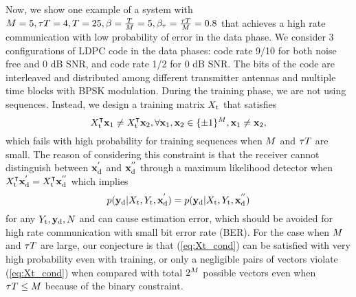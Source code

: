 \documentclass[conference]{IEEEtran}
\begin{document}
Now, we show one example of a system with $M=5,{\tau T}=4,T=25,\beta=\frac{T}{M}=5,\beta_{\rm{\tau}}=\frac{{\tau T}}{M}=0.8$ that achieves a high rate communication with low probability of error in the data phase. We consider 3 configurations of LDPC code in the data phases: code rate 9/10 for both noise free and 0 dB SNR, and code rate 1/2 for 0 dB SNR. The bits of the code are interleaved and distributed among different transmitter antennas and multiple time blocks with BPSK modulation. During the training phase, we are not using \iid sequences. Instead, we design a training matrix $X_{\rm t}$ that satisfies
\begin{equation}
    X_{\rm t}^{\intercal}{\mathbf{x}}_1\neq X_{\rm t}^{\intercal}{\mathbf{x}}_2,\forall {\mathbf{x}}_1,{\mathbf{x}}_2\in\{\pm1\}^M,{\mathbf{x}}_1\neq{\mathbf{x}}_2,
    \label{eq:Xt_cond}
\end{equation}
which fails with high probability for \iid training sequences when $M$ and ${\tau T}$ are small. The reason of considering this constraint is that the receiver cannot distinguish between ${\mathbf{x}}_{\rm d}^{'}$ and ${\mathbf{x}}_{\rm d}^{''}$ through a maximum likelihood detector when $X_{\rm t}^{\intercal}{\mathbf{x}}_{\rm d}^{'}=X_{\rm t}^{{\intercal}}{\mathbf{x}}_{\rm d}^{''}$ which implies
\begin{equation}
    p({\mathbf{y}}_{\rm d}|X_{\rm t},Y_{\rm t},{\mathbf{x}}_{\rm d}^{'})=p({\mathbf{y}}_{\rm d}|X_{\rm t},Y_{\rm t},{\mathbf{x}}_{\rm d}^{''})
\end{equation}
for any $Y_{\rm t},{\mathbf{y}}_{\rm d},N$ and can cause estimation error, which should be avoided for high rate communication with small bit error rate (BER). For the case when $M$ and ${\tau T}$ are large, our conjecture is that (\ref{eq:Xt_cond}) can be satisfied with very high probability even with \iid training, or only a negligible pairs of vectors violate (\ref{eq:Xt_cond}) when compared with total $2^M$ possible vectors even when ${\tau T}\leq M$ because of the binary constraint.
\end{document}
